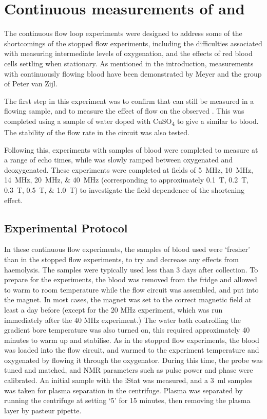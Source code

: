 \chapter{Continuous measurements of \Ttwo and \SOtwo}
\label{ch:cont}
The continuous flow loop experiments were designed to address some of the shortcomings of the stopped flow experiments, including the difficulties associated with measuring intermediate levels of oxygenation, and the effects of red blood cells settling when stationary.
As mentioned in the introduction, measurements with continuously flowing blood have been demonstrated by Meyer\cite{MeyerNMRrelaxationrates1995} and the group of Peter van Zijl\cite{GolayMeasurementtissueoxygen2001, ZhaoOxygenationhematocritdependence2007,QinDeterminationwholebrainoxygen2011,GrgacTransversewaterrelaxation2017}.

The first step in this experiment was to confirm that \Ttwo can still be measured in a flowing sample, and to measure the effect of flow on the observed \Ttwo.
This was completed using a sample of water doped with CuSO\textsubscript{4} to give a \Ttwo similar to blood.
The stability of the flow rate in the circuit was also tested.

Following this, experiments with samples of blood were completed to measure \Ttwo at a range of echo times, while \SOtwo was slowly ramped between oxygenated and deoxygenated.
These experiments were completed at fields of \SIlist{5;10;14;20;40}{MHz} (corresponding to approximately \SIlist{0.1;0.2;0.3;0.5;1.0}{T}) to investigate the field dependence of the \Ttwo shortening effect.

\section{Experimental Protocol}

In these continuous flow experiments, the samples of blood used were `fresher' than in the stopped flow experiments, to try and decrease any effects from haemolysis.
The samples were typically used less than 3 days after collection.
To prepare for the experiments, the blood was removed from the fridge and allowed to warm to room temperature while the flow circuit was assembled, and put into the magnet.
In most cases, the magnet was set to the correct magnetic field at least a day before (except for the 20 MHz experiment, which was run immediately after the 40 MHz experiment.)
The water bath controlling the gradient bore temperature was also turned on, this required approximately 40 minutes to warm up and stabilise.
As in the stopped flow experiments, the blood was loaded into the flow circuit, and warmed to the experiment temperature and oxygenated by flowing it through the oxygenator.
During this time, the probe was tuned and matched, and NMR parameters such as pulse power and phase were calibrated.
An initial sample with the iStat was measured, and a \SI{3}{ml} samples was taken for plasma separation in the centrifuge.
Plasma was separated by running the centrifuge at setting `5' for 15 minutes, then removing the plasma layer by pasteur pipette.

